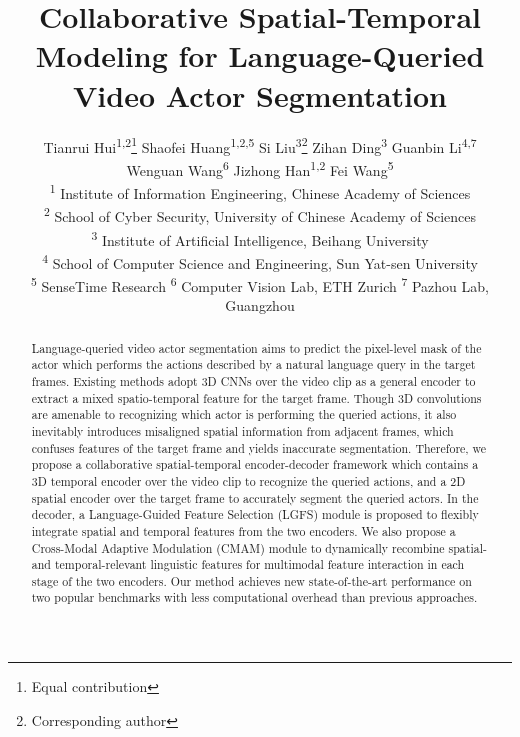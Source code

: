 \documentclass[final]{cvpr}
\makeatletter
\newcommand{\printfnsymbol}[1]{\textsuperscript{\@fnsymbol{#1}}}
\makeatother
\begin{document}
\title{Collaborative Spatial-Temporal Modeling for Language-Queried\\ Video Actor Segmentation}

\author{Tianrui Hui\textsuperscript{\rm 1,2}\thanks{Equal contribution} \quad Shaofei Huang\textsuperscript{\rm 1,2,5}\printfnsymbol{1} \quad Si Liu\textsuperscript{\rm 3}\thanks{Corresponding author} \quad Zihan Ding\textsuperscript{\rm 3} \quad Guanbin Li\textsuperscript{\rm 4,7} \\ \quad Wenguan Wang\textsuperscript{\rm 6} \quad Jizhong Han\textsuperscript{\rm 1,2} \quad Fei Wang\textsuperscript{\rm 5}\\
\textsuperscript{\rm 1} Institute of Information Engineering, Chinese Academy of Sciences\\
\textsuperscript{\rm 2} School of Cyber Security, University of Chinese Academy of Sciences\\
\textsuperscript{\rm 3} Institute of Artificial Intelligence, Beihang University \\
\textsuperscript{\rm 4} School of Computer Science and Engineering, Sun Yat-sen University \\
\textsuperscript{\rm 5} SenseTime Research 
\quad\textsuperscript{\rm 6} Computer Vision Lab, ETH Zurich
\quad\textsuperscript{\rm 7} Pazhou Lab, Guangzhou \\
}


\maketitle



\begin{abstract}
   Language-queried video actor segmentation aims to predict the pixel-level mask of the actor which performs the actions described by a natural language query in the target frames. 
   Existing methods adopt 3D CNNs over the video clip as a general encoder to extract a mixed spatio-temporal feature for the target frame. 
   Though 3D convolutions are amenable to recognizing which actor is performing the queried actions, it also inevitably introduces misaligned spatial information from adjacent frames, which confuses features of the target frame and yields inaccurate segmentation. 
   Therefore, we propose a collaborative spatial-temporal encoder-decoder framework which contains a 3D temporal encoder over the video clip to recognize the queried actions, and a 2D spatial encoder over the target frame to accurately segment the queried actors. 
   In the decoder, a Language-Guided Feature Selection (LGFS) module is proposed to flexibly integrate spatial and temporal features from the two encoders. 
   We also propose a Cross-Modal Adaptive Modulation (CMAM) module to dynamically recombine spatial- and temporal-relevant linguistic features for multimodal feature interaction in each stage of the two encoders. 
   Our method achieves new state-of-the-art performance on two popular benchmarks 
   with less computational overhead than previous approaches.
\end{abstract}
\end{document}
